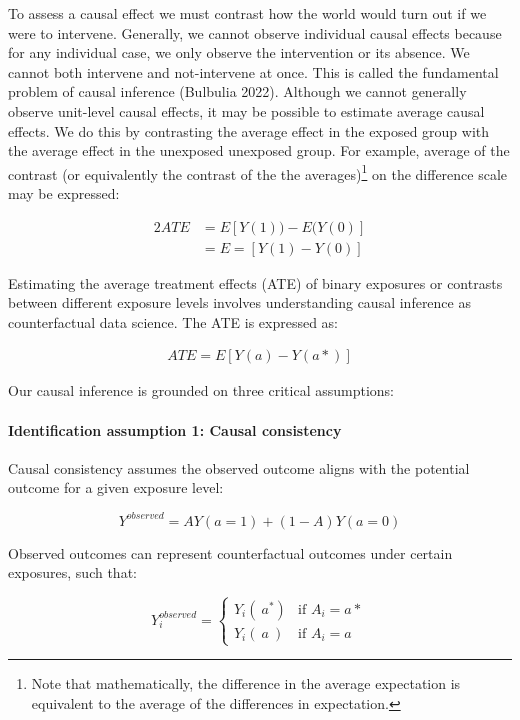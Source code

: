 \documentclass[
  letterpaper,
  DIV=11,
  numbers=noendperiod]{scrartcl}
\let\oldparagraph\paragraph
\renewcommand{\paragraph}[1]{\oldparagraph{#1}\mbox{}}
\begin{document}
To assess a causal effect we must contrast how the world would turn out
if we were to intervene. Generally, we cannot observe individual causal
effects because for any individual case, we only observe the
intervention or its absence. We cannot both intervene and not-intervene
at once. This is called the fundamental problem of causal inference
(Bulbulia 2022). Although we cannot generally observe unit-level causal
effects, it may be possible to estimate average causal effects. We do
this by contrasting the average effect in the exposed group with the
average effect in the unexposed unexposed group. For example, average of
the contrast (or equivalently the contrast of the the
averages)\footnote{Note that mathematically, the difference in the
  average expectation is equivalent to the average of the differences in
  expectation.} on the difference scale may be expressed:

\begin{alignat*}{2}
ATE & = E[Y(1)) - E(Y(0)]\\
& = E=[Y(1) - Y(0)]
\end{alignat*}

Estimating the average treatment effects (ATE) of binary exposures or
contrasts between different exposure levels involves understanding
causal inference as counterfactual data science. The ATE is expressed
as:

   \begin{align*}
    ATE = E[Y(a) - Y(a*)]
    \end{align*}

Our causal inference is grounded on three critical assumptions:

\hypertarget{identification-assumption-1-causal-consistency}{%
\paragraph{Identification assumption 1: Causal
consistency}\label{identification-assumption-1-causal-consistency}}

Causal consistency assumes the observed outcome aligns with the
potential outcome for a given exposure level:

\[Y^{observed} = AY(a=1) + (1-A)Y(a=0)\]

Observed outcomes can represent counterfactual outcomes under certain
exposures, such that:

\[
Y^{observed}_i = 
\begin{cases} 
Y_i(~a^*) & \text{if } A_i = a* \\
Y_i(~a~) & \text{if } A_i = a
\end{cases}
\]
\end{document}
